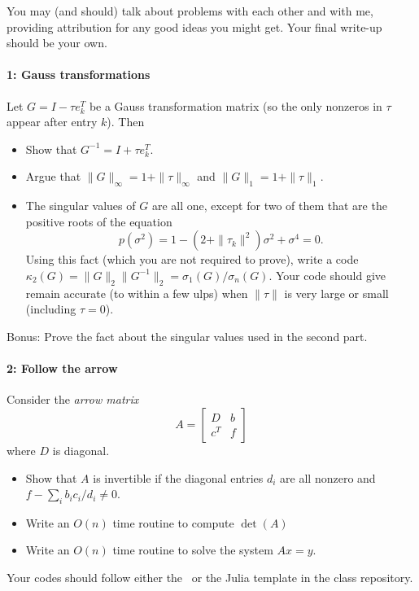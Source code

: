 \documentclass[12pt, leqno]{article} %
\begin{document}

You may (and should) talk about problems with each other and with me,
providing attribution for any good ideas you might get.  Your final
write-up should be your own.

\paragraph*{1: Gauss transformations}
Let $G = I-\tau e_k^T$ be a Gauss transformation matrix (so the only
nonzeros in $\tau$ appear after entry $k$).  Then
\begin{itemize}
\item Show that $G^{-1} = I+\tau e_k^T$.
\item Argue that $\|G\|_\infty = 1 + \|\tau\|_\infty$ and
  $\|G\|_1 = 1 + \|\tau\|_1$.
\item The singular values of $G$ are all one, except for two of them
  that are the positive roots of the equation
  \[
    p(\sigma^2) = 1 - (2+\|\tau_k\|^2) \sigma^2 + \sigma^4 = 0.
  \]
  Using this fact (which you are not required to prove), write a code
  $\kappa_2(G) = \|G\|_2 \|G^{-1}\|_2 = \sigma_1(G) / \sigma_n(G)$.
  Your code should give remain accurate (to within a few ulps) when
  $\|\tau\|$ is very large or small (including $\tau = 0$).
\end{itemize}
Bonus: Prove the fact about the singular values used in the second part.

\paragraph*{2: Follow the arrow}
Consider the {\em arrow matrix}
\[
  A = \begin{bmatrix} D & b \\ c^T & f \end{bmatrix}
\]
where $D$ is diagonal.
\begin{itemize}
\item Show that $A$ is invertible if the diagonal entries $d_i$ are
  all nonzero and $f-\sum_i b_i c_i / d_i \neq 0$.
\item Write an $O(n)$ time routine to compute $\det(A)$
\item Write an $O(n)$ time routine to solve the system $Ax = y$.
\end{itemize}
Your codes should follow either the \matlab\ or the Julia template in
the class repository.
\end{document}

